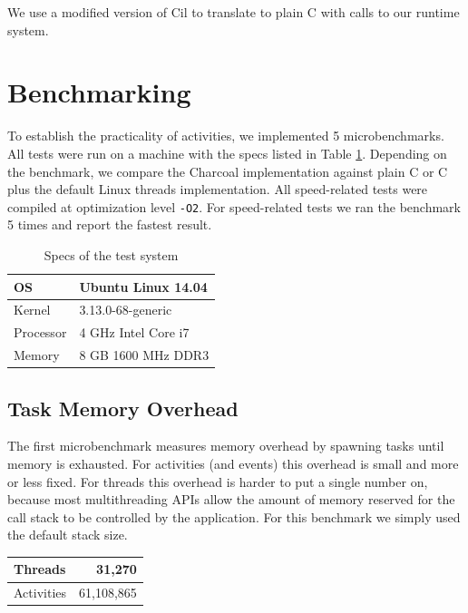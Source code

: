 \documentclass[pldi,10pt,preprint]{sigplanconf-pldi16}
\begin{document}
We use a modified version of Cil \cite{Necula2002} to translate \charcoal{} to plain C with calls to our runtime system.

\section{Benchmarking}

To establish the practicality of activities, we implemented 5 microbenchmarks.
All tests were run on a machine with the specs listed in Table \ref{table:specs}.
Depending on the benchmark, we compare the Charcoal implementation against plain C or C plus the default Linux threads implementation.
All speed-related tests were compiled at optimization level \texttt{-O2}.
For speed-related tests we ran the benchmark 5 times and report the fastest result.

\begin{table}
  \centering
  \begin{tabular}{|l|l|}
    \hline
    OS & Ubuntu Linux 14.04 \\
    \hline
    Kernel & 3.13.0-68-generic \\
    \hline
    Processor & 4 GHz Intel Core i7 \\
    \hline
    Memory & 8 GB 1600 MHz DDR3 \\
    \hline
  \end{tabular}
  \caption{Specs of the test system}
  \label{table:specs}
\end{table}

\subsection{Task Memory Overhead}

The first microbenchmark measures memory overhead by spawning tasks until memory is exhausted.
For activities (and events) this overhead is small and more or less fixed.
For threads this overhead is harder to put a single number on, because most multithreading APIs allow the amount of memory reserved for the call stack to be controlled by the application.
For this benchmark we simply used the default stack size.

\vspace{1em}
\begin{tabular}{|l|r|}
  \hline
  Threads & 31,270 \\
  \hline
  Activities & 61,108,865 \\
  \hline
\end{tabular}
\vspace{1em}
\end{document}
